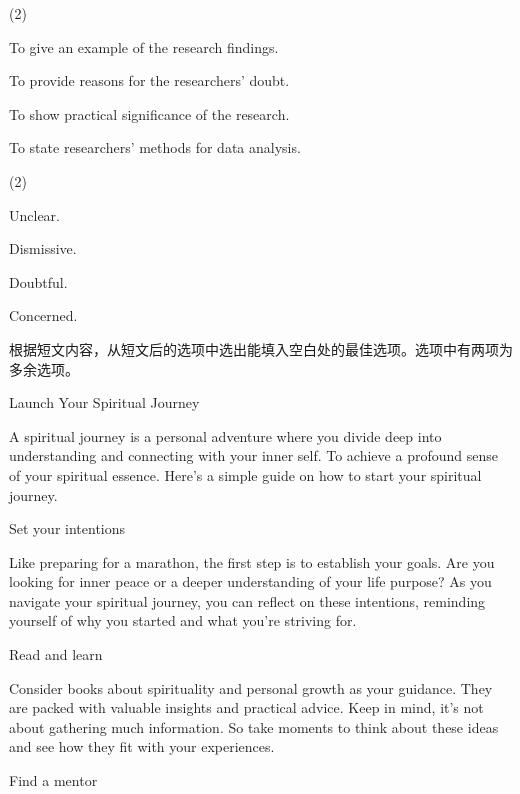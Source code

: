 \documentclass{英语试卷}
\begin{document}
\begin{choices}(2)
  \item To give an example of the research findings.
  \item To provide reasons for the researchers' doubt.
  \item To show practical significance of the research.
  \item To state researchers' methods for data analysis.
\end{choices}
\begin{choices}(2)
  \item Unclear.
  \item Dismissive.
  \item Doubtful.
  \item Concerned.
\end{choices}
\par 根据短文内容，从短文后的选项中选出能填入空白处的最佳选项。选项中有两项为多余选项。\par
\par Launch Your Spiritual Journey\par
\par A spiritual journey is a personal adventure where you divide deep into understanding and connecting with your inner self.  To achieve a profound sense of your spiritual essence. Here's a simple guide on how to start your spiritual journey.\par
\par Set your intentions\par
\par Like preparing for a marathon, the first step is to establish your goals.  Are you looking for inner peace or a deeper understanding of your life purpose? As you navigate your spiritual journey, you can reflect on these intentions, reminding yourself of why you started and what you're striving for.\par
\par Read and learn\par
\par Consider books about spirituality and personal growth as your guidance. They are packed with valuable insights and practical advice. Keep in mind, it's not about gathering much information.  So take moments to think about these ideas and see how they fit with your experiences.\par
\par Find a mentor\par
\end{document}
